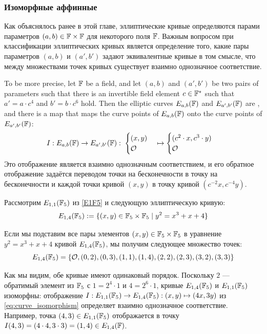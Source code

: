 \subsubsection{Изоморфные аффинные }
\label{sec:isomorphic_curves} Как объяснялось ранее в этой главе, эллиптические кривые определяются парами параметров $(a, b)\in \mathbb{F}\times \mathbb{F}$ для некоторого поля $\mathbb{F}$. Важным вопросом при классификации эллиптических кривых является определение того, какие пары параметров $(a,b)$ и $(a',b')$ задают эквивалентные кривые в том смысле, что между множествами точек кривых существует взаимно однозначное соответствие.

To be more precise, let $\mathbb{F}$ be a field, and let $(a,b)$ and $(a',b')$ be two pairs of parameters such that there is an invertible field element $c\in \mathbb{F}^*$ such that $a' = a\cdot c^4$ and $b' = b\cdot c^6$ hold. Then the elliptic curves $E_{a,b}(\mathbb{F})$ and $E_{a',b'}(\mathbb{F})$ are , and there is a map that maps the curve points of $E_{a,b}(\mathbb{F})$ onto the curve points of $E_{a',b'}(\mathbb{F})$:
\begin{equation}
\label{eq:curve_isomorphism}
I: E_{a,b}(\mathbb{F}) \to E_{a',b'}(\mathbb{F}):\; \begin{cases}(x,y)\\\mathcal{O}\end{cases}
\mapsto \begin{cases}(c^2\cdot x,c^3\cdot y)\\\mathcal{O}\end{cases}
\end{equation}
Это отображение является взаимно однозначным соответствием, и его обратное отображение задаётся переводом точки на бесконечности в точку на бесконечности и каждой точки кривой $(x,y)$ в точку кривой $(c^{-2}x,c^{-4}y)$.
\begin{example}
\label{ex:isomorphic_E1F5}
 Рассмотрим  $E_{1,1}(\mathbb{F}_5)$ из \examplename{} \ref{E1F5} и следующую эллиптическую кривую:
\begin{equation}
E_{1,4}(\mathbb{F}_5):= \{(x,y)\in \mathbb{F}_5\times \mathbb{F}_5 \; | \; y^2 = x^3 + x + 4 \}
\end{equation}

Если мы подставим все пары элементов $(x,y)\in \mathbb{F}_5\times \mathbb{F}_5$ в уравнение  $y^2 = x^3 + x + 4$ кривой $E_{1,4}(\mathbb{F}_5)$, мы получим следующее множество точек:
\begin{equation}
E_{1,4}(\mathbb{F}_5) = \{
\mathcal{O}, (0,2), (0,3), (1,1), (1,4), (2,2), (2,3), (3,2), (3,3)\}
\end{equation}

Как мы видим, обе кривые имеют одинаковый порядок. Поскольку $2$ — обратимый элемент из $\mathbb{F}_5$ с $1 = 2^4\cdot 1$ и $4=2^6\cdot 1$, кривые $E_{1,4}(\mathbb{F}_5)$ и $E_{1,1}(\mathbb{F}_5)$ изоморфны: отображение $I: E_{1,1}(\mathbb{F}_5)\to E_{1,4}(\mathbb{F}_5): (x,y)\mapsto (4x,3y)$ из \ref{eq:curve_isomorphism} определяет взаимно однозначное соответствие. Например, точка $(4,3)\in E_{1,1}(\mathbb{F}_5)$ отображается в точку $I(4,3)=(4\cdot 4, 3\cdot 3) = (1,4)\in E_{1,4}(\mathbb{F})$.
\end{example}
  
